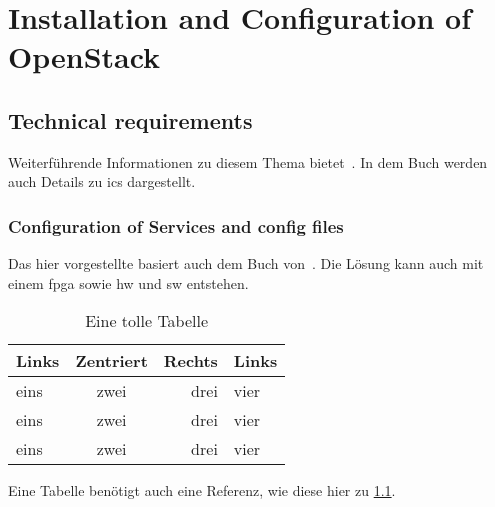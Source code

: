
\chapter{Installation and Configuration of OpenStack}\label{ch:config}

\blindtext[1]

\section{Technical requirements}\label{sec:erstegdl}

Weiterführende Informationen zu diesem Thema bietet~\cite{Herrmann2004}. In dem Buch werden auch Details zu \acp{ic}
dargestellt.
\blindtext[2]
\blindenumerate{}
\blindtext[2]

\subsection{Configuration of Services and config files}\label{ssec:ersteUGdl}

Das hier vorgestellte basiert auch dem Buch von~\cite{Heinkel2000}. Die Lösung kann auch mit einem \ac{fpga} sowie
\ac{hw} und \ac{sw} entstehen.
\blindtext[4]


\blindtext[1]
\begin{table}[htpb]
  \centering
  \caption{Eine tolle Tabelle}\label{tab:ett}
  \begin{tabular}{lcrl}
  Links & Zentriert & Rechts & Links \\
  \toprule
  eins & zwei & drei & vier \\
  eins & zwei & drei & vier \\
  eins & zwei & drei & vier \\
  \end{tabular}
\end{table}

Eine Tabelle benötigt auch eine Referenz, wie diese hier zu \ref{tab:ett}.
\blindtext[1]






